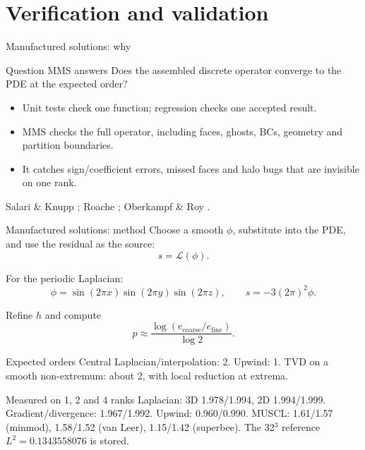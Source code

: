 \documentclass[aspectratio=169,10pt]{beamer}
\begin{document}
\section{Verification and validation}

\begin{frame}{Manufactured solutions: why}
  \begin{block}{Question MMS answers}
    Does the assembled discrete operator converge to the PDE at the expected
    order?
  \end{block}

  \begin{itemize}
    \item Unit tests check one function; regression checks one accepted result.
    \item MMS checks the full operator, including faces, ghosts, BCs,
          geometry and partition boundaries.
    \item It catches sign/coefficient errors, missed faces and halo bugs that
          are invisible on one rank.
  \end{itemize}

  \small
  Salari \& Knupp \cite{salari2000}; Roache \cite{roache2002}; Oberkampf \& Roy
  \cite{oberkampfRoy2010}.
\end{frame}

\begin{frame}{Manufactured solutions: method}
  Choose a smooth $\phi$, substitute into the PDE, and use the residual as the
  source:
  \[
    s = \mathcal{L}(\phi).
  \]

  For the periodic Laplacian:
  \[
    \phi=\sin(2\pi x)\sin(2\pi y)\sin(2\pi z),
    \qquad
    s=-3(2\pi)^2\phi.
  \]

  Refine $h$ and compute
  \[
    p \approx \frac{\log(e_{\mathrm{coarse}}/e_{\mathrm{fine}})}{\log 2}.
  \]

  \begin{block}{Expected orders}
    Central Laplacian/interpolation: 2. Upwind: 1. TVD on a smooth non-extremum:
    about 2, with local reduction at extrema.
  \end{block}

  \begin{block}{Measured on 1, 2 and 4 ranks}
    Laplacian: 3D 1.978/1.994, 2D 1.994/1.999. Gradient/divergence:
    1.967/1.992. Upwind: 0.960/0.990. MUSCL: 1.61/1.57 (minmod), 1.58/1.52
    (van Leer), 1.15/1.42 (superbee). The 32$^3$ reference
    $L^2=0.1343558076$ is stored.
  \end{block}
\end{frame}
\end{document}
